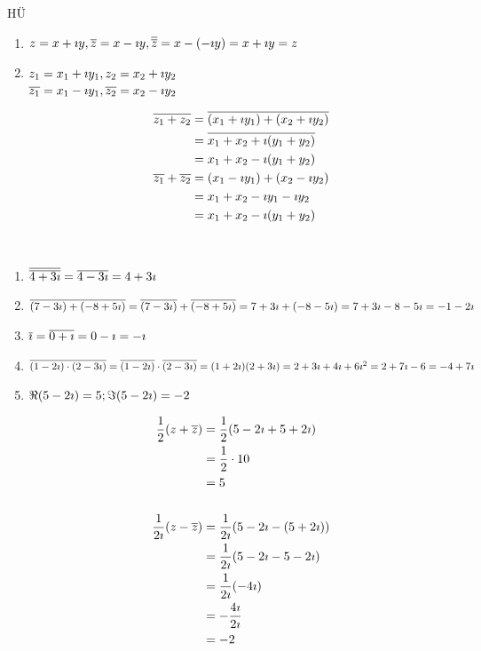 \Beweis HÜ

\begin{enumerate}
	\item $z=x+\imath y, \overline{z}=x-\imath y, \overline{\overline{z}}=x-(-\imath y) = x+\imath y = z$
	\item %
	$z_1=x_1+\imath y_1, z_2=x_2+\imath y_2$\\
	$\overline{z_1}=x_1-\imath y_1, \overline{z_2}=x_2-\imath y_2$
	
	\begin{align*}
	\overline{z_1+z_2}&=\overline{(x_1+\imath y_1)+(x_2+\imath y_2)}\\
	&=\overline{x_1+x_2+\imath(y_1+y_2)}\\
	&=x_1+x_2-\imath(y_1+y_2)\\
	\overline{z_1}+\overline{z_2}&=(x_1-\imath y_1)+(x_2-\imath y_2)\\
	&=x_1+x_2-\imath y_1-\imath y_2\\
	&=x_1+x_2-\imath(y_1+y_2)
	\end{align*}
\end{enumerate}

\Bsps \ 
\begin{enumerate}
	\item $\overline{\overline{4+3\imath}} = \overline{4-3\imath} = 4+3\imath$
	\item $\overline{(7-3\imath)+(-8+5\imath)} = \overline{(7-3\imath)}+\overline{(-8+5\imath)}\\
	= 7+3\imath+(-8-5\imath)\\
	=7+3\imath-8-5\imath\\
	=-1-2\imath$
	\item $\overline{\imath} = \overline{0+\imath}=0-\imath=-\imath$
	\item $\overline{(1-2\imath)\cdot(2-3\imath)} = \overline{(1-2\imath)}\cdot\overline{(2-3\imath)}\\
	= (1+2\imath)(2+3\imath)\\
	= 2+3\imath+4\imath+6\imath^2\\
	= 2+7\imath-6\\
	= -4+7\imath$
	\item $\Re(5-2\imath)=5; \Im(5-2\imath)=-2$
	
	\begin{align*}
		\dfrac{1}{2}(z+\overline{z}) &= \dfrac{1}{2}(5-2\imath+5+2\imath)\\
		&= \dfrac{1}{2}\cdot 10\\
		&= 5\\
		\\
		\dfrac{1}{2\imath}(z-\overline{z}) &= \dfrac{1}{2\imath}(5-2\imath-(5+2\imath))\\
		&= \dfrac{1}{2\imath}(5-2\imath-5-2\imath)\\
		&= \dfrac{1}{2\imath}(-4\imath)\\
		&= -\dfrac{4\imath}{2\imath}\\
		&= -2
	\end{align*}
\end{enumerate}

